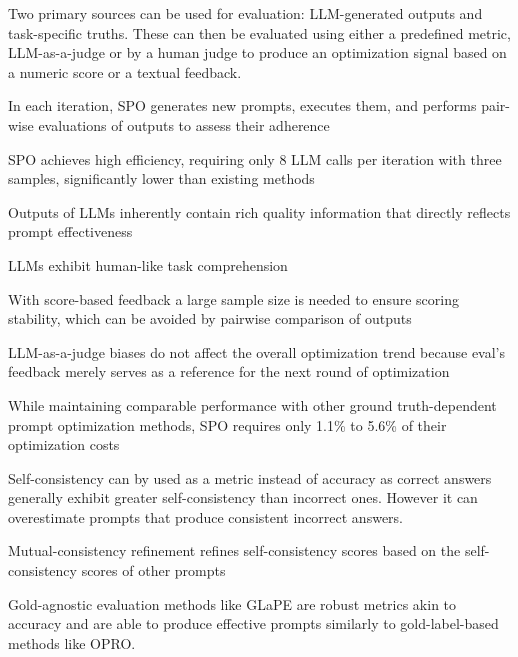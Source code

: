 Two primary sources can be used for evaluation: LLM-generated outputs and task-specific truths. These can then be evaluated using either a predefined metric, LLM-as-a-judge or by a human judge to produce an optimization signal based on a numeric score or a textual feedback.  \cite{xiang2025selfsupervisedpromptoptimization}

In each iteration, SPO generates new prompts, executes them, and performs pair-wise evaluations of outputs to assess their adherence \cite{xiang2025selfsupervisedpromptoptimization}

SPO achieves high efficiency, requiring only 8 LLM calls per iteration with three samples, significantly lower than existing methods \cite{xiang2025selfsupervisedpromptoptimization}

Outputs of LLMs inherently contain rich quality information that directly reflects prompt effectiveness \cite{xiang2025selfsupervisedpromptoptimization}

LLMs exhibit human-like task comprehension \cite{xiang2025selfsupervisedpromptoptimization}

With score-based feedback a large sample size is needed to ensure scoring stability, which can be avoided by pairwise comparison of outputs \cite{xiang2025selfsupervisedpromptoptimization}

LLM-as-a-judge biases do not affect the overall optimization trend because eval’s feedback merely serves as a reference for the next round of optimization \cite{xiang2025selfsupervisedpromptoptimization}

While maintaining comparable performance with other ground truth-dependent prompt optimization methods, SPO requires only 1.1\% to 5.6\% of their optimization costs \cite{xiang2025selfsupervisedpromptoptimization}



Self-consistency can by used as a metric instead of accuracy as correct answers generally exhibit greater self-consistency than incorrect ones. However it can overestimate prompts that produce consistent incorrect answers. \cite{zhang2024glapegoldlabelagnosticprompt}

Mutual-consistency refinement refines self-consistency scores based on the self-consistency scores of other prompts \cite{zhang2024glapegoldlabelagnosticprompt}

Gold-agnostic evaluation methods like GLaPE are robust metrics akin to accuracy and are able to produce effective prompts similarly to gold-label-based methods like OPRO\cite{yang2024largelanguagemodelsoptimizers}. \cite{zhang2024glapegoldlabelagnosticprompt}

